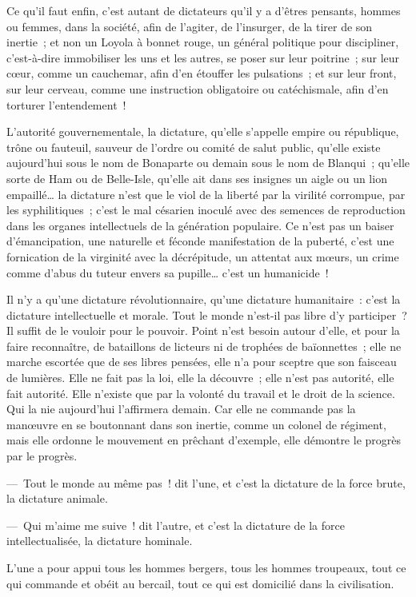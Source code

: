 \documentclass[french,twoside]{book} %
\begin{document}
Ce qu’il faut enfin, c’est autant de dictateurs qu’il y a d’êtres pensants, hommes ou femmes, dans la société, afin de l’agiter, de l’insurger, de la tirer de son inertie ; et non un Loyola à bonnet rouge, un général politique pour discipliner, c’est-à-dire immobiliser les uns et les autres, se poser sur leur poitrine ; sur leur cœur, comme un cauchemar, afin d’en étouffer les pulsations ; et sur leur front, sur leur cerveau, comme une instruction obligatoire ou catéchismale, afin d’en torturer l’entendement !\par
L’autorité gouvernementale, la dictature, qu’elle s’appelle empire ou république, trône ou fauteuil, sauveur de l’ordre ou comité de salut public, qu’elle existe aujourd’hui sous le nom de Bonaparte ou demain sous le nom de Blanqui ; qu’elle sorte de Ham ou de Belle-Isle, qu’elle ait dans ses insignes un aigle ou un lion empaillé… la dictature n’est que le viol de la liberté par la virilité corrompue, par les syphilitiques ; c’est le mal césarien inoculé avec des semences de reproduction dans les organes intellectuels de la génération populaire. Ce n’est pas un baiser d’émancipation, une naturelle et féconde manifestation de la puberté, c’est une fornication de la virginité avec la décrépitude, un attentat aux mœurs, un crime comme d’abus du tuteur envers sa pupille… c’est un humanicide !\par
Il n’y a qu’une dictature révolutionnaire, qu’une dictature humanitaire : c’est la dictature intellectuelle et morale. Tout le monde n’est-il pas libre d’y participer ? Il suffit de le vouloir pour le pouvoir. Point n’est besoin autour d’elle, et pour la faire reconnaître, de bataillons de licteurs ni de trophées de baïonnettes ; elle ne marche escortée que de ses libres pensées, elle n’a pour sceptre que son faisceau de lumières. Elle ne fait pas la loi, elle la découvre ; elle n’est pas autorité, elle fait autorité. Elle n’existe que par la volonté du travail et le droit de la science. Qui la nie aujourd’hui l’affirmera demain. Car elle ne commande pas la manœuvre en se boutonnant dans son inertie, comme un colonel de régiment, mais elle ordonne le mouvement en prêchant d’exemple, elle démontre le progrès par le progrès.\par
— Tout le monde au même pas ! dit l’une, et c’est la dictature de la force brute, la dictature animale.\par
— Qui m’aime me suive ! dit l’autre, et c’est la dictature de la force intellectualisée, la dictature hominale.\par
L’une a pour appui tous les hommes bergers, tous les hommes troupeaux, tout ce qui commande et obéit au bercail, tout ce qui est domicilié dans la civilisation.\par
\end{document}
